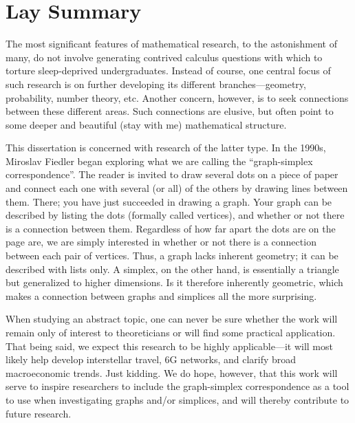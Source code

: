 \chapter*{Lay Summary}

The  most  significant features of mathematical research, to the astonishment of  many, do not involve generating contrived  calculus  questions with which to torture sleep-deprived undergraduates. 
Instead of course, one central focus of such research is on further developing  its different branches---geometry, probability, number theory, etc.  Another concern, however, is to seek connections between these different areas. Such  connections are elusive, but often point to some deeper and beautiful (stay with me) mathematical structure. 

This dissertation is concerned with research of the latter type. In  the 1990s, Miroslav Fiedler began exploring what we are calling the ``graph-simplex correspondence''. 
The  reader is invited  to draw several dots  on a piece of paper and connect each one with  several (or all) of the others by drawing  lines between them. There; you have  just succeeded in drawing a graph. Your graph can be  described  by listing the dots (formally  called vertices), and whether or not there is a  connection between  them. Regardless of how far  apart the dots  are on the page are, we are  simply interested in whether or not there is a  connection between each pair of vertices. Thus, a graph  lacks inherent  geometry; it  can  be described with  lists only. A simplex, on the other  hand, is essentially a triangle but generalized  to higher dimensions. Is it therefore inherently geometric, which makes a connection between graphs and simplices all the more surprising. 

When studying an abstract topic, one can never be  sure  whether the work will remain only of interest to theoreticians or will find some practical application. That being said, we expect this research to be highly applicable---it will most likely help develop interstellar travel, 6G networks, and clarify broad macroeconomic trends. Just kidding. We do hope, however, that this work will serve to inspire researchers to include the  graph-simplex correspondence as a tool to use when  investigating graphs and/or simplices, and will thereby contribute to future  research. 
 

